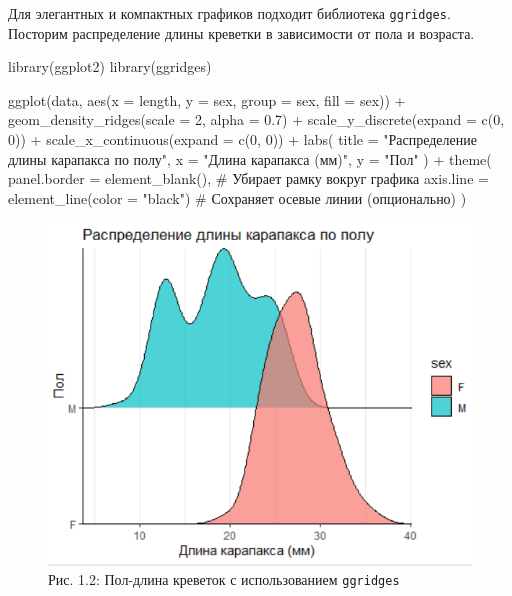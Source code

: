 \documentclass[
  letterpaper,
  DIV=11,
  numbers=noendperiod]{scrreprt}
\newenvironment{Shaded}{\begin{snugshade}}{\end{snugshade}}
\newcommand{\AttributeTok}[1]{\textcolor[rgb]{0.40,0.45,0.13}{#1}}
\newcommand{\CommentTok}[1]{\textcolor[rgb]{0.37,0.37,0.37}{#1}}
\newcommand{\DecValTok}[1]{\textcolor[rgb]{0.68,0.00,0.00}{#1}}
\newcommand{\FloatTok}[1]{\textcolor[rgb]{0.68,0.00,0.00}{#1}}
\newcommand{\FunctionTok}[1]{\textcolor[rgb]{0.28,0.35,0.67}{#1}}
\newcommand{\NormalTok}[1]{\textcolor[rgb]{0.00,0.23,0.31}{#1}}
\newcommand{\SpecialCharTok}[1]{\textcolor[rgb]{0.37,0.37,0.37}{#1}}
\newcommand{\StringTok}[1]{\textcolor[rgb]{0.13,0.47,0.30}{#1}}
\begin{document}
Для элегантных и компактных графиков подходит библиотека
\texttt{ggridges}. Посторим распределение длины креветки в зависимости
от пола и возраста.

\begin{Shaded}
\begin{Highlighting}[]
\FunctionTok{library}\NormalTok{(ggplot2)}
\FunctionTok{library}\NormalTok{(ggridges)}

\FunctionTok{ggplot}\NormalTok{(data, }\FunctionTok{aes}\NormalTok{(}\AttributeTok{x =}\NormalTok{ length, }
                 \AttributeTok{y =}\NormalTok{ sex, }
                 \AttributeTok{group =}\NormalTok{ sex, }
                 \AttributeTok{fill =}\NormalTok{ sex)) }\SpecialCharTok{+}
  \FunctionTok{geom\_density\_ridges}\NormalTok{(}\AttributeTok{scale =} \DecValTok{2}\NormalTok{, }\AttributeTok{alpha =} \FloatTok{0.7}\NormalTok{) }\SpecialCharTok{+}
  \FunctionTok{scale\_y\_discrete}\NormalTok{(}\AttributeTok{expand =} \FunctionTok{c}\NormalTok{(}\DecValTok{0}\NormalTok{, }\DecValTok{0}\NormalTok{)) }\SpecialCharTok{+}
  \FunctionTok{scale\_x\_continuous}\NormalTok{(}\AttributeTok{expand =} \FunctionTok{c}\NormalTok{(}\DecValTok{0}\NormalTok{, }\DecValTok{0}\NormalTok{)) }\SpecialCharTok{+}
  \FunctionTok{labs}\NormalTok{(}
    \AttributeTok{title =} \StringTok{"Распределение длины карапакса по полу"}\NormalTok{,}
    \AttributeTok{x =} \StringTok{"Длина карапакса (мм)"}\NormalTok{,}
    \AttributeTok{y =} \StringTok{"Пол"}
\NormalTok{  ) }\SpecialCharTok{+}
  \FunctionTok{theme}\NormalTok{(}
    \AttributeTok{panel.border =} \FunctionTok{element\_blank}\NormalTok{(),  }\CommentTok{\# Убирает рамку вокруг графика}
    \AttributeTok{axis.line =} \FunctionTok{element\_line}\NormalTok{(}\AttributeTok{color =} \StringTok{"black"}\NormalTok{)  }\CommentTok{\# Сохраняет осевые линии (опционально)}
\NormalTok{  )}
\end{Highlighting}
\end{Shaded}

\begin{figure}[H]

{\centering \includegraphics[width=0.6\linewidth,height=\textheight,keepaspectratio]{images/ggridges_shrimp.PNG}

}

\caption{Рис. 1.2: Пол-длина креветок с использованием
\texttt{ggridges}}

\end{figure}%
\end{document}
